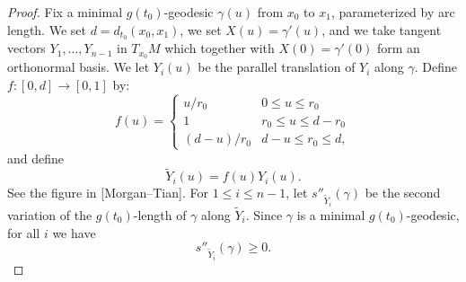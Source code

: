 \begin{proof}
\sketch Fix a minimal $g(t_0)$-geodesic $\gamma(u)$ from $x_0$ to $x_1$,
parameterized by arc length. We set $d=d_{t_0}(x_0,x_1)$, we set
$X(u)=\gamma'(u)$, and we take tangent vectors $Y_1,\ldots,Y_{n-1}$
in $T_{x_0}M$ which together with $X(0)=\gamma'(0)$ form an
orthonormal basis. We let $Y_i(u)$ be the parallel translation of
$Y_i$ along $\gamma$. Define $f\colon [0,d]\to [0,1]$ by:
$$f(u)=\begin{cases}u/r_0  & 0\le u\le r_0 \\ 1 & r_0\le u\le d-r_0 \\
(d-u)/r_0 & d-u\le r_0\le d, \end{cases}$$ and define $$\widetilde
Y_i(u)=f(u)Y_i(u).$$ See the figure in [Morgan--Tian].
 For $1\le i\le n-1$, let $s''_{\widetilde
Y_i}(\gamma)$ be the second variation of the $g(t_0)$-length of
$\gamma$ along $\widetilde Y_i$. Since $\gamma$ is a minimal
$g(t_0)$-geodesic, for all $i$ we have
\begin{equation}\label{geoineq}
s''_{\widetilde Y_i}(\gamma)\ge 0.\end{equation}





\end{proof}
